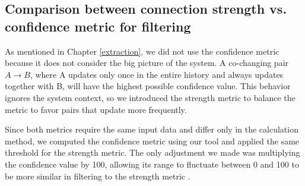 \subsection{Comparison between connection strength vs. confidence metric for filtering}
\label{sec:measure_metrics}

\hspace{4em}As mentioned in Chapter \ref{extraction}, we did not use the confidence metric because it does not consider the big picture of the system. A co-changing pair $A \rightarrow B$, where A updates only once in the entire history and always updates together with B, will have the highest possible confidence value. This behavior ignores the system context, so we introduced the strength metric to balance the metric to favor pairs that update more frequently.

Since both metrics require the same input data and differ only in the calculation method, we computed the confidence metric using our tool and applied the same threshold for the strength metric. The only adjustment we made was multiplying the confidence value by 100, allowing its range to fluctuate between 0 and 100 to be more similar in filtering to the strength metric \cite{b4}.

\begin{table}[!h]
\setlength\tabcolsep{3.5pt}
\caption{ Average results obtained with strength versus confidence metric.}
\label{tab:confidence_vs_strength}
\centering
{}
\end{table}

